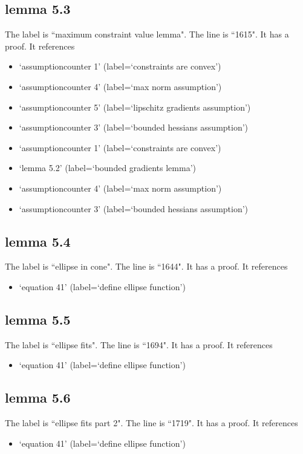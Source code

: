 \documentclass{article}
\begin{document}
\subsection{lemma 5.3}
The label is ``maximum constraint value lemma".
The line is ``1615".
It has a proof.
It references \begin{itemize}
\item `assumptioncounter 1' (label=`constraints are convex')
\item `assumptioncounter 4' (label=`max norm assumption')
\item `assumptioncounter 5' (label=`lipschitz gradients assumption')
\item `assumptioncounter 3' (label=`bounded hessians assumption')
\item `assumptioncounter 1' (label=`constraints are convex')
\item `lemma 5.2' (label=`bounded gradients lemma')
\item `assumptioncounter 4' (label=`max norm assumption')
\item `assumptioncounter 3' (label=`bounded hessians assumption')
\end{itemize}
\subsection{lemma 5.4}
The label is ``ellipse in cone".
The line is ``1644".
It has a proof.
It references \begin{itemize}
\item `equation 41' (label=`define ellipse function')
\end{itemize}
\subsection{lemma 5.5}
The label is ``ellipse fits".
The line is ``1694".
It has a proof.
It references \begin{itemize}
\item `equation 41' (label=`define ellipse function')
\end{itemize}
\subsection{lemma 5.6}
The label is ``ellipse fits part 2".
The line is ``1719".
It has a proof.
It references \begin{itemize}
\item `equation 41' (label=`define ellipse function')
\end{itemize}
\end{document}
